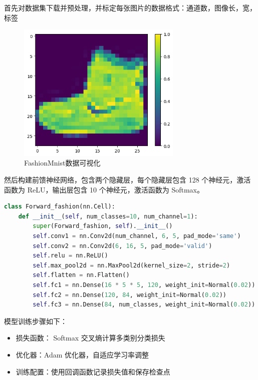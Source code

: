 \documentclass[12pt]{ctexart}
\begin{document}
首先对数据集下载并预处理，并标定每张图片的数据格式：{通道数，图像长，宽，标签}
\begin{figure}[H]
    \centering
    \includegraphics[width=0.7\textwidth]{image/1.png}
    \caption{FashionMnist数据可视化}
\end{figure}

然后构建前馈神经网络，包含两个隐藏层，每个隐藏层包含 128 个神经元，激活函数为 ReLU，输出层包含 10 个神经元，激活函数为 Softmax。
\newpage
\begin{lstlisting}[language=Python,caption={前馈神经网络模型}]
class Forward_fashion(nn.Cell):
    def __init__(self, num_classes=10, num_channel=1):
        super(Forward_fashion, self).__init__()
        self.conv1 = nn.Conv2d(num_channel, 6, 5, pad_mode='same')
        self.conv2 = nn.Conv2d(6, 16, 5, pad_mode='valid')
        self.relu = nn.ReLU()
        self.max_pool2d = nn.MaxPool2d(kernel_size=2, stride=2)
        self.flatten = nn.Flatten()
        self.fc1 = nn.Dense(16 * 5 * 5, 120, weight_init=Normal(0.02))
        self.fc2 = nn.Dense(120, 84, weight_init=Normal(0.02))
        self.fc3 = nn.Dense(84, num_classes, weight_init=Normal(0.02))
\end{lstlisting}

模型训练步骤如下：

\begin{itemize}
    \item 损失函数： Softmax 交叉熵计算多类别分类损失
    \item 优化器：Adam 优化器，自适应学习率调整
    \item 训练配置：使用回调函数记录损失值和保存检查点
\end{itemize}
\end{document}
